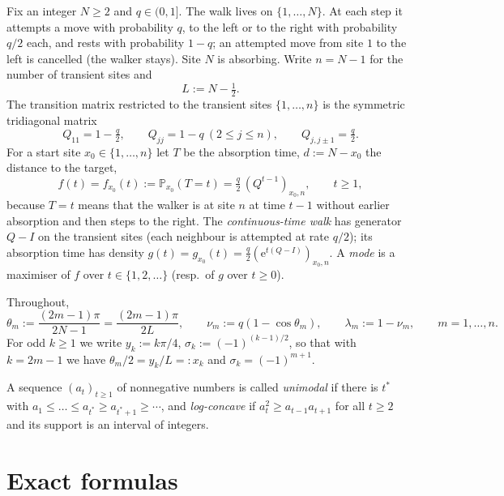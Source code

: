 \documentclass[11pt,a4paper]{article}
\theoremstyle{definition}
\theoremstyle{remark}
\renewcommand{\P}{\mathbb{P}}
\newcommand{\ee}{\mathrm{e}}
\begin{document}
Fix an integer $N\ge 2$ and $q\in(0,1]$. The walk lives on $\{1,\dots,N\}$. At each step it attempts a move
with probability $q$, to the left or to the right with probability $q/2$ each, and rests with probability
$1-q$; an attempted move from site $1$ to the left is cancelled (the walker stays). Site $N$ is absorbing.
Write $n=N-1$ for the number of transient sites and
\[
  L:=N-\tfrac12 .
\]
The transition matrix restricted to the transient sites $\{1,\dots,n\}$ is the symmetric tridiagonal matrix
\begin{equation}\label{eq:Q}
  Q_{11}=1-\tfrac q2,\qquad Q_{jj}=1-q\ (2\le j\le n),\qquad Q_{j,j\pm1}=\tfrac q2 .
\end{equation}
For a start site $x_0\in\{1,\dots,n\}$ let $T$ be the absorption time, $d:=N-x_0$ the distance to the target,
\[
  f(t)=f_{x_0}(t):=\P_{x_0}(T=t)=\tfrac q2\,(Q^{t-1})_{x_0,n},\qquad t\ge 1 ,
\]
because $T=t$ means that the walker is at site $n$ at time $t-1$ without earlier absorption and then steps
to the right. The \emph{continuous-time walk} has generator $Q-I$ on the transient sites (each neighbour is
attempted at rate $q/2$); its absorption time has density $g(t)=g_{x_0}(t)=\frac q2(\ee^{t(Q-I)})_{x_0,n}$.
A \emph{mode} is a maximiser of $f$ over $t\in\{1,2,\dots\}$ (resp.\ of $g$ over $t\ge0$).

Throughout,
\[
  \theta_m:=\frac{(2m-1)\pi}{2N-1}=\frac{(2m-1)\pi}{2L},\qquad
  \nu_m:=q(1-\cos\theta_m),\qquad \lambda_m:=1-\nu_m,\qquad m=1,\dots,n .
\]
For odd $k\ge1$ we write $y_k:=k\pi/4$, $\sigma_k:=(-1)^{(k-1)/2}$, so that with $k=2m-1$ we have
$\theta_m/2=y_k/L=:x_k$ and $\sigma_k=(-1)^{m+1}$.

A sequence $(a_t)_{t\ge1}$ of nonnegative numbers is called \emph{unimodal} if there is $t^*$ with
$a_1\le\dots\le a_{t^*}\ge a_{t^*+1}\ge\cdots$, and \emph{log-concave} if $a_t^2\ge a_{t-1}a_{t+1}$ for all $t\ge2$
and its support is an interval of integers.

\section{Exact formulas}\label{sec:exact}
\end{document}
